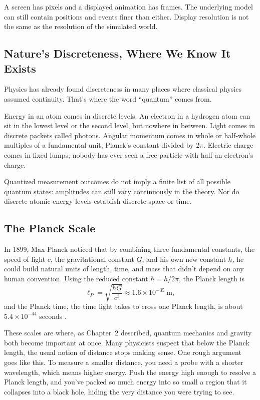 A screen has pixels and a displayed animation has frames. The underlying model can still contain positions and events finer than either. Display resolution is not the same as the resolution of the simulated world.

\subsection{Nature's Discreteness, Where We Know It Exists}

Physics has already found discreteness in many places where classical physics assumed continuity. That's where the word ``quantum'' comes from.

Energy in an atom comes in discrete levels. An electron in a hydrogen atom can sit in the lowest level or the second level, but nowhere in between. Light comes in discrete packets called photons. Angular momentum comes in whole or half-whole multiples of a fundamental unit, Planck's constant divided by \(2\pi\). Electric charge comes in fixed lumps; nobody has ever seen a free particle with half an electron's charge.

Quantized measurement outcomes do not imply a finite list of all possible quantum states: amplitudes can still vary continuously in the theory. Nor do discrete atomic energy levels establish discrete space or time.

\subsection{The Planck Scale}

In 1899, Max Planck noticed that by combining three fundamental constants, the speed of light \(c\), the gravitational constant \(G\), and his own new constant \(h\), he could build natural units of length, time, and mass that didn't depend on any human convention. Using the reduced constant \(\hbar = h/2\pi\), the Planck length is
\[
\ell_P = \sqrt{\frac{\hbar G}{c^3}} \approx 1.6 \times 10^{-35}\ \text{m},
\]
and the Planck time, the time light takes to cross one Planck length, is about \(5.4 \times 10^{-44}\) seconds \cite{codata2018}.

These scales are where, as Chapter~2 described, quantum mechanics and gravity both become important at once. Many physicists suspect that below the Planck length, the usual notion of distance stops making sense. One rough argument goes like this. To measure a smaller distance, you need a probe with a shorter wavelength, which means higher energy. Push the energy high enough to resolve a Planck length, and you've packed so much energy into so small a region that it collapses into a black hole, hiding the very distance you were trying to see.

